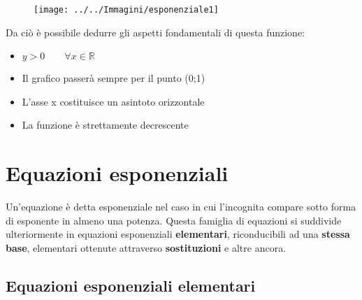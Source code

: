 \documentclass[10pt, a4paper]{article}
\theoremstyle{remark}
\begin{document}
\begin{figure}[th]
	\centering
	\texttt{[image: ../../Immagini/esponenziale1]}
	\caption*{}
	\label{fig:esponenziale1}
\end{figure}

Da ciò è possibile dedurre gli aspetti fondamentali di questa funzione:

\begin{itemize}
	\item $y>0 \qquad \forall x \in \mathbb{R}$
	\item Il grafico passerà sempre per il punto (0;1)
	\item L'asse x costituisce un asintoto orizzontale
	\item La funzione è strettamente decrescente
\end{itemize}

\section*{Equazioni esponenziali}

Un'equazione è detta esponenziale nel caso in cui l'incognita compare sotto forma di esponente in almeno una potenza. Questa famiglia di equazioni si suddivide ulteriormente in equazioni esponenziali \textbf{elementari}, riconducibili ad una \textbf{stessa base}, elementari ottenute attraverso \textbf{sostituzioni} e altre ancora.

\subsection*{Equazioni esponenziali elementari}
\end{document}
